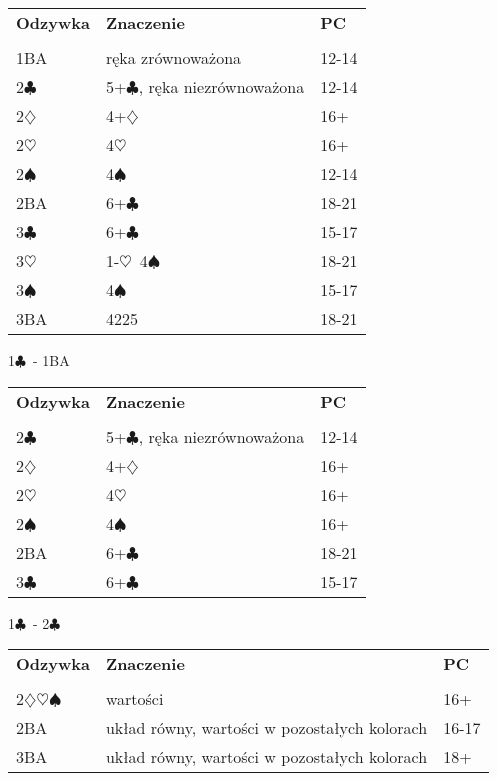 \documentclass{article}
\renewcommand{\c}{\(\clubsuit\)}
\renewcommand{\d}{\(\diamondsuit\)}
\newcommand{\h}{\(\heartsuit\)}
\newcommand{\s}{\(\spadesuit\)}
\begin{document}
\begin{tabular}{p{2cm} p{10cm} l}
	\textbf{Odzywka} & \textbf{Znaczenie} & \textbf{PC}\\\\
	1BA & ręka zrównoważona & 12-14 \\
	2\c & 5+\c, ręka niezrównoważona & 12-14 \\
	2\d & 4+\d & 16+ \\
	2\h & 4\h & 16+ \\
	2\s & 4\s & 12-14 \\
	2BA & 6+\c & 18-21 \\
	3\c & 6+\c & 15-17 \\
	3\h & 1-\h\ 4\s & 18-21 \\
	3\s & 4\s & 15-17 \\
	3BA & 4225 & 18-21 
\end{tabular}
\begin{center}\LARGE{1\c\ - 1BA}
\end{center}

\begin{tabular}{p{2cm} p{10cm} l}
	\textbf{Odzywka} & \textbf{Znaczenie} & \textbf{PC}\\\\
	2\c & 5+\c, ręka niezrównoważona & 12-14 \\
	2\d & 4+\d & 16+ \\
	2\h & 4\h & 16+ \\
	2\s & 4\s & 16+ \\
	2BA & 6+\c & 18-21 \\
	3\c & 6+\c & 15-17 \\
\end{tabular}

\begin{center}\LARGE{1\c\ - 2\c}
\end{center}

\begin{tabular}{p{2cm} p{10cm} l}
	\textbf{Odzywka} & \textbf{Znaczenie} & \textbf{PC}\\\\
	2\d\h\s & wartości & 16+ \\
	2BA & układ równy, wartości w pozostałych kolorach & 16-17 \\
	3BA & układ równy, wartości w pozostałych kolorach & 18+
\end{tabular}
\end{document}
